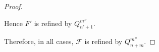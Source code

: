 \documentclass[10pt,a4paper]{amsart}
\newcommand{\mc}[1]{\mathcal{#1}}
\begin{document}
\begin{proof}
\begin{enumerate}
        Hence $F'$ is refined by $Q_{n'+1}^{m''}$.
    \end{enumerate}
    Therefore, in all cases, $\mc{F}$ is refined by $Q_{n+m}^{m''}$.
\end{proof}
\end{document}
